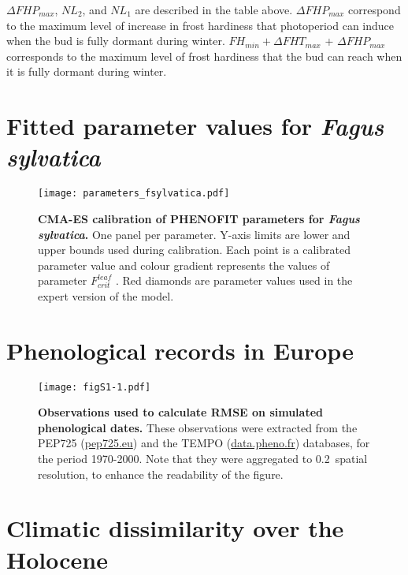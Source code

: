 \documentclass[preprint,12pt,authoryear]{elsarticle}
\begin{document}
{\noindent $\Delta FHP_{max}$, $NL_2$, and $NL_1$ are described in the table above. $\Delta FHP_{max}$ correspond to the maximum level of increase in frost hardiness that photoperiod can induce when the bud is fully dormant during winter. $FH_{min} + \Delta FHT_{max}$ + $\Delta FHP_{max}$ corresponds to the maximum level of frost hardiness that the bud can reach when it is fully dormant during winter. 

\newpage

\section{Fitted parameter values for \emph{Fagus sylvatica}}

\begin{figure}[hp]
\vspace*{-0.5cm}
\hspace*{-0.5cm}
\centerline{\texttt{[image: parameters\_fsylvatica.pdf]}}
\caption{\textbf{CMA-ES calibration of PHENOFIT parameters for \emph{Fagus sylvatica}.} One panel per parameter. Y-axis limits are lower and upper bounds used during calibration. Each point is a calibrated parameter value and colour gradient represents the values of parameter $F_{crit}^{leaf}$ . Red diamonds are parameter values used in the expert version of the model.}
\vspace*{-10cm}
\end{figure}


\newpage

\section{Phenological records in Europe}

\begin{figure}[hp]
\centering
\centerline{\texttt{[image: figS1-1.pdf]}}
\caption{\textbf{Observations used to calculate RMSE on simulated phenological dates.} These observations were extracted from the PEP725 (\url{pep725.eu}) and the TEMPO (\url{data.pheno.fr}) databases, for the period 1970-2000. Note that they were aggregated to 0.2\degree~spatial resolution, to enhance the readability of the figure.}
\vspace*{-10cm}
\end{figure}
\restoregeometry

\clearpage

\section{Climatic dissimilarity over the Holocene}

}
\end{document}
